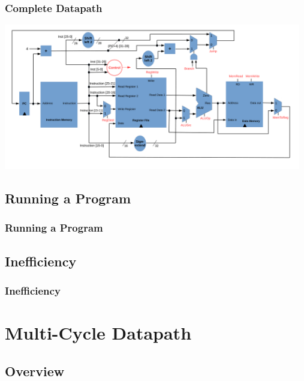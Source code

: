 \documentclass{beamer}
\begin{document}
\begin{frame}%
\frametitle{Complete Datapath}

\begin{center}
\hspace*{-1cm}\includegraphics[width=13cm]{complete_single_cycle.pdf}
\end{center}

\end{frame}

\subsection{Running a Program}

\begin{frame}%
\frametitle{Running a Program}

\end{frame}


\subsection{Inefficiency}

\begin{frame}%
\frametitle{Inefficiency}

\end{frame}

\section{Multi-Cycle Datapath}

\subsection{Overview}
\end{document}
